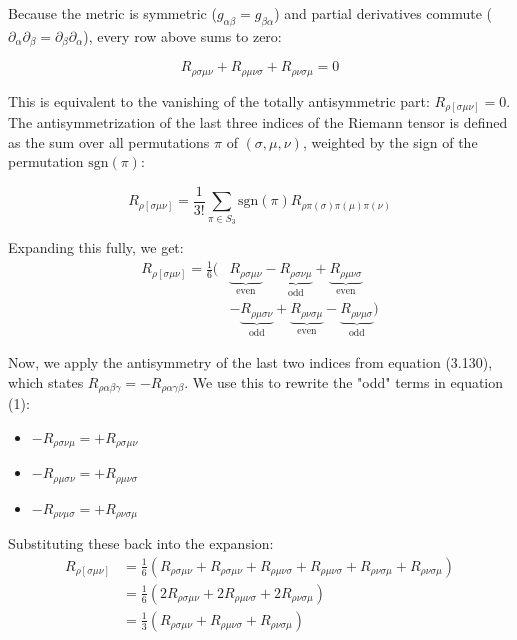 \documentclass[11pt, a4paper]{report}
\begin{document}
Because the metric is symmetric ($g_{\alpha\beta} = g_{\beta\alpha}$) and partial derivatives commute ($\partial_\alpha \partial_\beta = \partial_\beta \partial_\alpha$), every row above sums to zero:

\begin{equation*}
    R_{\rho\sigma\mu\nu} + R_{\rho\mu\nu\sigma} + R_{\rho\nu\sigma\mu} = 0
\end{equation*}    

This is equivalent to the vanishing of the totally antisymmetric part: \(R_{\rho[\sigma\mu\nu]} = 0\).
The antisymmetrization of the last three indices of the Riemann tensor is defined as the sum over all permutations $\pi$ of $(\sigma, \mu, \nu)$, weighted by the sign of the permutation $\text{sgn}(\pi)$:

\begin{equation*}
R_{\rho[\sigma\mu\nu]} = \frac{1}{3!} \sum_{\pi \in S_3} \text{sgn}(\pi) R_{\rho\pi(\sigma)\pi(\mu)\pi(\nu)}
\end{equation*}

Expanding this fully, we get:
\begin{align*}
R_{\rho[\sigma\mu\nu]} = \frac{1}{6} \Big( & \underbrace{R_{\rho\sigma\mu\nu}}_{\text{even}} - \underbrace{R_{\rho\sigma\nu\mu}}_{\text{odd}} + \underbrace{R_{\rho\mu\nu\sigma}}_{\text{even}} \\
& - \underbrace{R_{\rho\mu\sigma\nu}}_{\text{odd}} + \underbrace{R_{\rho\nu\sigma\mu}}_{\text{even}} - \underbrace{R_{\rho\nu\mu\sigma}}_{\text{odd}} \Big) \tag{1}
\end{align*}

Now, we apply the antisymmetry of the last two indices from equation (3.130), which states $R_{\rho\alpha\beta\gamma} = -R_{\rho\alpha\gamma\beta}$. We use this to rewrite the "odd" terms in equation (1):
\begin{itemize}
    \item $-R_{\rho\sigma\nu\mu} = +R_{\rho\sigma\mu\nu}$
    \item $-R_{\rho\mu\sigma\nu} = +R_{\rho\mu\nu\sigma}$
    \item $-R_{\rho\nu\mu\sigma} = +R_{\rho\nu\sigma\mu}$
\end{itemize}

Substituting these back into the expansion:
\begin{align*}
R_{\rho[\sigma\mu\nu]} &= \frac{1}{6} \left( R_{\rho\sigma\mu\nu} + R_{\rho\sigma\mu\nu} + R_{\rho\mu\nu\sigma} + R_{\rho\mu\nu\sigma} + R_{\rho\nu\sigma\mu} + R_{\rho\nu\sigma\mu} \right) \\
&= \frac{1}{6} \left( 2R_{\rho\sigma\mu\nu} + 2R_{\rho\mu\nu\sigma} + 2R_{\rho\nu\sigma\mu} \right) \\
&= \frac{1}{3} \left( R_{\rho\sigma\mu\nu} + R_{\rho\mu\nu\sigma} + R_{\rho\nu\sigma\mu} \right) \tag{2}
\end{align*}
\end{document}
